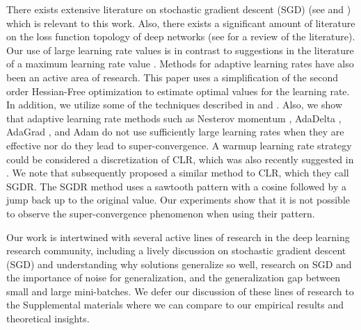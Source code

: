 \documentclass{article}
\begin{document}
There  exists extensive literature on stochastic gradient descent (SGD) (see \citet{goodfellow2016deep} and \citet{bottou2012stochastic}) which is relevant to this work.
Also, there exists a significant amount of literature on the loss function topology of deep networks (see \citet{chaudhari2016entropy}  for a review of the literature).
Our use of large learning rate values is in contrast to suggestions in the literature of a maximum learning rate value \cite{bottou2016optimization}.
Methods for adaptive learning rates have also been an active area of research.
This paper uses a simplification of the second order Hessian-Free optimization \citep{martens2010deep} to estimate optimal values for the learning rate.
In addition, we utilize some of the techniques described in \citet{schaul2013no} and \citet{gulcehre2017robust}.
Also, we show  that adaptive learning rate methods such as  Nesterov momentum \citep{sutskever2013importance,nesterov1983method}, AdaDelta \citep{duchi2011adaptive}, AdaGrad \citep{zeiler2012adadelta}, and Adam \citep{kingma2014adam} do not use sufficiently large learning rates when they are effective nor do they lead to super-convergence. 
A warmup learning rate strategy \citep{he2016deep,goyal2017accurate} could be considered a discretization of CLR, which was also recently suggested in \citep{jastrzkebski2017three}.
We  note that \citet{loshchilov2016sgdr} subsequently proposed a similar method to CLR, which they call SGDR.
The SGDR method uses a sawtooth pattern with a cosine followed by a jump back up to the original value.
Our experiments show that it is not possible to observe the super-convergence phenomenon when using their pattern.

Our work is intertwined with several active lines of research in the deep learning research community, including a lively discussion on stochastic gradient descent (SGD) and understanding why solutions generalize so well, research on SGD and the importance of noise for generalization, and the generalization gap between small and large mini-batches.
We defer our discussion of these lines of research to the Supplemental materials where we can compare to our empirical results and theoretical insights.




\end{document}
